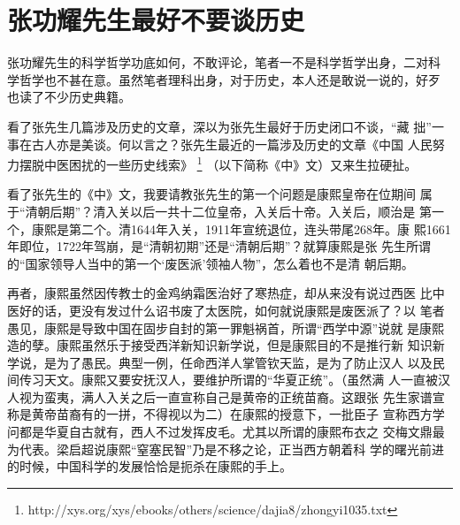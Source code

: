 \section{张功耀先生最好不要谈历史}
张功耀先生的科学哲学功底如何，不敢评论，笔者一不是科学哲学出身，二对科
学哲学也不甚在意。虽然笔者理科出身，对于历史，本人还是敢说一说的，好歹
也读了不少历史典籍。

看了张先生几篇涉及历史的文章，深以为张先生最好于历史闭口不谈，“藏
拙”一事在古人亦是美谈。何以言之？张先生最近的一篇涉及历史的文章《中国
人民努力摆脱中医困扰的一些历史线索》
\footnote{http://xys.org/xys/ebooks/others/science/dajia8/zhongyi1035.txt}
（以下简称《中》文）又来生拉硬扯。

看了张先生的《中》文，我要请教张先生的第一个问题是康熙皇帝在位期间
属于“清朝后期”？清入关以后一共十二位皇帝，入关后十帝。入关后，顺治是
第一个，康熙是第二个。清1644年入关，1911年宣统退位，连头带尾268年。康
熙1661年即位，1722年驾崩，是“清朝初期”还是“清朝后期”？就算康熙是张
先生所谓的“国家领导人当中的第一个‘废医派’领袖人物”，怎么着也不是清
朝后期。

再者，康熙虽然因传教士的金鸡纳霜医治好了寒热症，却从来没有说过西医
比中医好的话，更没有发过什么诏书废了太医院，如何就说康熙是废医派了？以
笔者愚见，康熙是导致中国在固步自封的第一罪魁祸首，所谓“西学中源”说就
是康熙造的孽。康熙虽然乐于接受西洋新知识新学说，但是康熙目的不是推行新
知识新学说，是为了愚民。典型一例，任命西洋人掌管钦天监，是为了防止汉人
以及民间传习天文。康熙又要安抚汉人，要维护所谓的“华夏正统”。（虽然满
人一直被汉人视为蛮夷，满人入关之后一直宣称自己是黄帝的正统苗裔。这跟张
先生家谱宣称是黄帝苗裔有的一拼，不得视以为二）在康熙的授意下，一批臣子
宣称西方学问都是华夏自古就有，西人不过发挥皮毛。尤其以所谓的康熙布衣之
交梅文鼎最为代表。梁启超说康熙“窒塞民智”乃是不移之论，正当西方朝着科
学的曙光前进的时候，中国科学的发展恰恰是扼杀在康熙的手上。